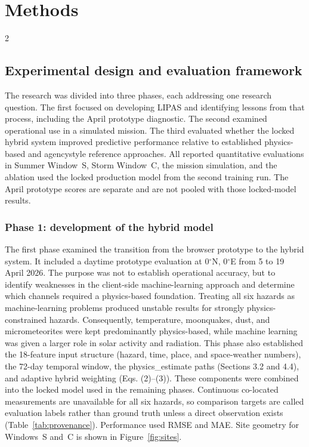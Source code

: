 \section{Methods}
\begin{multicols}{2}

\subsection{Experimental design and evaluation framework}

The research was divided into three phases, each addressing one research question. The first focused on developing LIPAS and identifying lessons from that process, including the April prototype diagnostic. The second examined operational use in a simulated mission. The third evaluated whether the locked hybrid system improved predictive performance relative to established physics-based and agencystyle reference approaches. All reported quantitative evaluations in Summer Window~S, Storm Window~C, the mission simulation, and the ablation used the locked production model from the second training run. The April prototype scores are separate and are not pooled with those locked-model results.

\subsubsection{Phase 1: development of the hybrid model}

The first phase examined the transition from the browser prototype to the hybrid system. It included a daytime prototype evaluation at 0$^\circ$N, 0$^\circ$E from 5 to 19 April 2026. The purpose was not to establish operational accuracy, but to identify weaknesses in the client-side machine-learning approach and determine which channels required a physics-based foundation. Treating all six hazards as machine-learning problems produced unstable results for strongly physics-constrained hazards. Consequently, temperature, moonquakes, dust, and micrometeorites were kept predominantly physics-based, while machine learning was given a larger role in solar activity and radiation. This phase also established the 18-feature input structure (hazard, time, place, and space-weather numbers), the 72-day temporal window, the physics\_estimate paths (Sections 3.2 and 4.4), and adaptive hybrid weighting (Eqs. (2)--(3)). These components were combined into the locked model used in the remaining phases. Continuous co-located measurements are unavailable for all six hazards, so comparison targets are called evaluation labels rather than ground truth unless a direct observation exists (Table~\ref{tab:provenance}). Performance used RMSE and MAE. Site geometry for Windows~S and~C is shown in Figure~\ref{fig:sites}.


\end{multicols}
